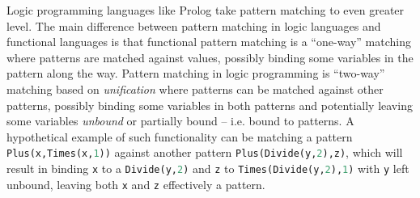 \documentclass[preprint]{sigplanconf}
\DeclareRobustCommand{\codeocaml}[1]{{\lstinline[breaklines=false,language=Caml]{#1}}}
\begin{document}

Logic programming languages like Prolog take pattern matching to even greater 
level. The main difference between pattern matching in logic languages and 
functional languages is that functional pattern matching is a ``one-way'' 
matching where patterns are matched against values, possibly binding some 
variables in the pattern along the way. Pattern matching in logic programming is 
``two-way'' matching based on \emph{unification} where patterns can be matched 
against other patterns, possibly binding some variables in both patterns and 
potentially leaving some variables \emph{unbound} or partially bound -- i.e. 
bound to patterns. A hypothetical example of such functionality can be matching 
a pattern \codeocaml{Plus(x,Times(x,1))} against another pattern 
\codeocaml{Plus(Divide(y,2),z)}, which will result in binding \codeocaml{x} to a 
\codeocaml{Divide(y,2)} and \codeocaml{z} to \codeocaml{Times(Divide(y,2),1)} 
with \codeocaml{y} left unbound, leaving both \codeocaml{x} and \codeocaml{z} 
effectively a pattern.


\end{document}
